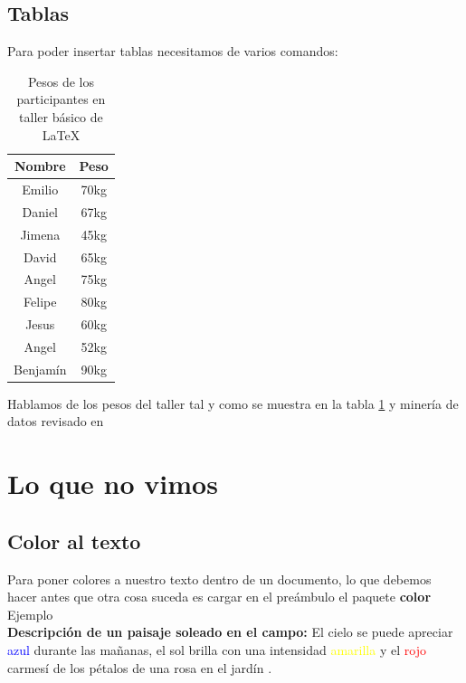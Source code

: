 \documentclass{article}
\begin{document}
\subsection{Tablas}
Para poder insertar tablas necesitamos de varios comandos:
\begin{table}[H]
    \centering
    \begin{tabular}{|c|c|}
    \hline
        \textbf{Nombre} & \textbf{Peso}  \\ \hline
        Emilio & 70kg\\ \hline
            Daniel & 67kg\\ \hline
            Jimena & 45kg \\ \hline
            David & 65kg \\ \hline
            Angel & 75kg \\ \hline
            Felipe & 80kg \\ \hline
            Jesus & 60kg \\ \hline
            Angel & 52kg \\ \hline
            Benjamín & 90kg \\ \hline
    \end{tabular}
    \caption{Pesos de los participantes en taller básico de \LaTeX}
    \label{tab:1}
\end{table}
{\normalsize Hablamos de los pesos del taller tal y como se muestra en la tabla \ref{tab:1}} y {\tiny minería de datos} revisado en \cite{primerart}
\section{Lo que no vimos}
\subsection{Color al texto}
Para poner colores a nuestro texto dentro de un documento, lo que debemos hacer antes que otra cosa suceda es cargar en el preámbulo el paquete \textbf{color}\\
Ejemplo\\
\textbf{Descripción de un paisaje soleado en el campo:} El cielo se puede apreciar \textcolor{blue}{azul} durante las mañanas, el sol brilla con una intensidad \textcolor{yellow}{amarilla} y el \textcolor{red}{rojo} carmesí de los pétalos de una rosa en el jardín .
\end{document}
